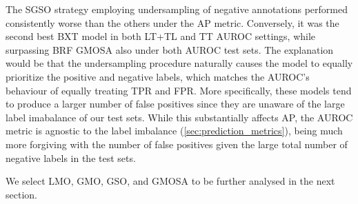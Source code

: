 The SGSO strategy employing undersampling of negative annotations performed consistently worse than the others under the AP metric. Conversely, it was the second best BXT model in both LT+TL and TT AUROC settings, while surpassing BRF GMOSA also under both AUROC test sets. The explanation would be that the undersampling procedure naturally causes the model to equally prioritize the positive and negative labels, which matches the AUROC's behaviour of equally treating TPR and FPR.
More specifically, these models tend to produce a larger number of false positives since they are unaware of the large label imabalance of our test sets. While this substantially affects AP, the AUROC metric is agnostic to the label imbalance (\autoref{sec:prediction_metrics}), being much more forgiving with the number of false positives given the large total number of negative labels in the test sets.


We select LMO, GMO, GSO, and GMOSA to be further analysed in the next section.





